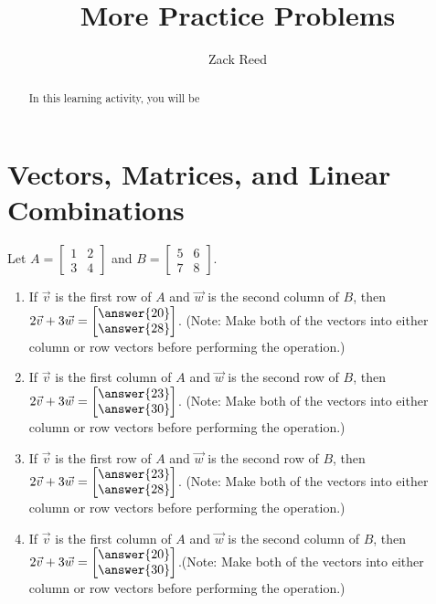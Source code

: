 \documentclass{ximera}
\author{Zack Reed}
\title{More Practice Problems}
\begin{document}
\begin{abstract}

    In this learning activity, you will be 
\end{abstract}
\maketitle



\section*{Vectors, Matrices, and Linear Combinations}

\begin{example}\label{ex:basesprob}
    Let $A=\begin{bmatrix} 1 & 2 \\ 3 & 4 \end{bmatrix}$ and $B=\begin{bmatrix} 5 & 6 \\ 7 & 8 \end{bmatrix}$. 
    \begin{enumerate}
        \item If $\vec{v}$ is the first row of $A$ and $\vec{w}$ is the second column of $B$, then $2\vec{v}+3\vec{w} = \begin{bmatrix} \answer{20} \\ \answer{28} \end{bmatrix}$. (Note: Make both of the vectors into either column or row vectors before performing the operation.)
        
        \item If $\vec{v}$ is the first column of $A$ and $\vec{w}$ is the second row of $B$, then $2\vec{v}+3\vec{w} = \begin{bmatrix} \answer{23} \\ \answer{30} \end{bmatrix}$. (Note: Make both of the vectors into either column or row vectors before performing the operation.)
        
        \item If $\vec{v}$ is the first row of $A$ and $\vec{w}$ is the second row of $B$, then $2\vec{v}+3\vec{w} = \begin{bmatrix} \answer{23} \\ \answer{28} \end{bmatrix}$. (Note: Make both of the vectors into either column or row vectors before performing the operation.)
        
        \item If $\vec{v}$ is the first column of $A$ and $\vec{w}$ is the second column of $B$, then $2\vec{v}+3\vec{w} = \begin{bmatrix} \answer{20} \\ \answer{30} \end{bmatrix}$.(Note: Make both of the vectors into either column or row vectors before performing the operation.)
    \end{enumerate}
\end{example}
\end{document}
